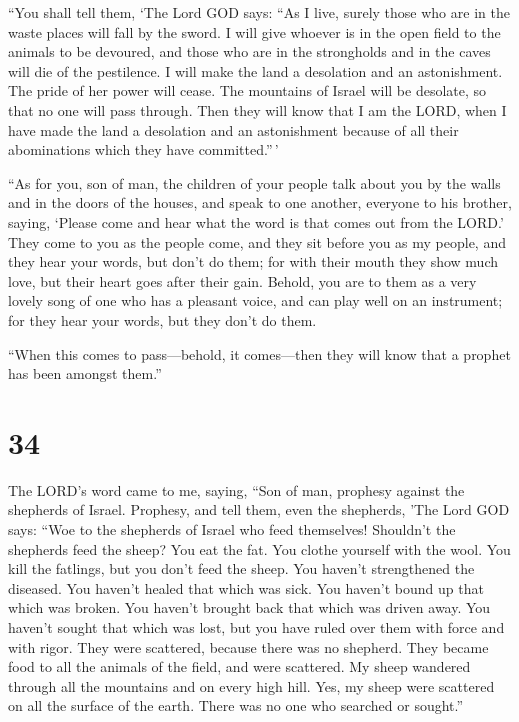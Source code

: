  ``You shall tell them, `The Lord GOD says: ``As I live,
surely those who are in the waste places will fall by the sword. I will
give whoever is in the open field to the animals to be devoured, and
those who are in the strongholds and in the caves will die of the
pestilence.  I will make the land a desolation and an
astonishment. The pride of her power will cease. The mountains of Israel
will be desolate, so that no one will pass through.  Then
they will know that I am the LORD, when I have made the land a
desolation and an astonishment because of all their abominations which
they have committed.''\,'

 ``As for you, son of man, the children of your people talk
about you by the walls and in the doors of the houses, and speak to one
another, everyone to his brother, saying, `Please come and hear what the
word is that comes out from the LORD.'  They come to you as
the people come, and they sit before you as my people, and they hear
your words, but don't do them; for with their mouth they show much love,
but their heart goes after their gain.  Behold, you are to
them as a very lovely song of one who has a pleasant voice, and can play
well on an instrument; for they hear your words, but they don't do them.

 ``When this comes to pass---behold, it comes---then they
will know that a prophet has been amongst them.''

\hypertarget{section-32}{%
\section{34}\label{section-32}}

 The LORD's word came to me, saying,  ``Son of
man, prophesy against the shepherds of Israel. Prophesy, and tell them,
even the shepherds, 'The Lord GOD says: ``Woe to the shepherds of Israel
who feed themselves! Shouldn't the shepherds feed the sheep?
 You eat the fat. You clothe yourself with the wool. You
kill the fatlings, but you don't feed the sheep.  You
haven't strengthened the diseased. You haven't healed that which was
sick. You haven't bound up that which was broken. You haven't brought
back that which was driven away. You haven't sought that which was lost,
but you have ruled over them with force and with rigor. 
They were scattered, because there was no shepherd. They became food to
all the animals of the field, and were scattered.  My sheep
wandered through all the mountains and on every high hill. Yes, my sheep
were scattered on all the surface of the earth. There was no one who
searched or sought.''

